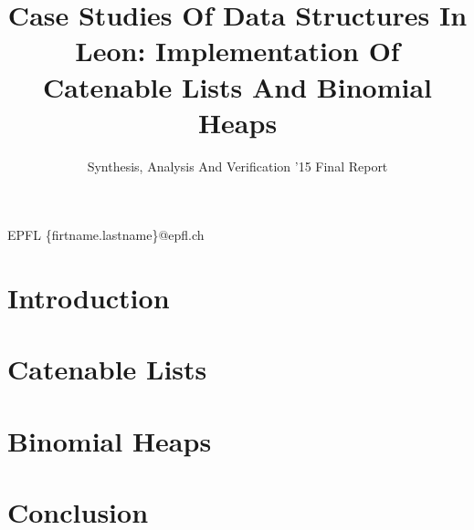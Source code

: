 \documentclass[nocopyrightspace,11pt,authoryear,preprint]{sigplanconf}
\begin{document}


\title{Case Studies Of Data Structures In Leon: Implementation Of Catenable Lists And Binomial Heaps}
\subtitle{Synthesis, Analysis And Verification '15 Final Report}

           {EPFL}
           {\{firtname.lastname\}@epfl.ch}

\maketitle

\section{Introduction}


\section{Catenable Lists}


\section{Binomial Heaps}


\section{Conclusion}




\end{document}
